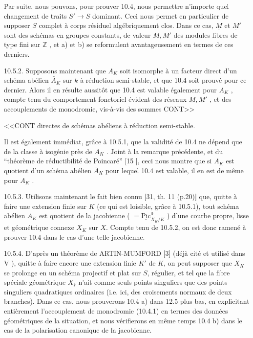 Par suite, nous pouvons, pour prouver 10.4, nous permettre n'importe quel changement de traits $S' \longrightarrow S$ dominant. Ceci nous permet en particulier de supposer $S$ complet à corps résiduel algébriquement clos. Dans ce cas, $\underline{M}$ et $\underline{M}'$ sont des schémas en groupes constants, de valeur $M,M'$ des modules libres de type fini sur $\mathbb{Z}$ , et a) et b) se reformulent avantageusement en termes de ces derniers.

10.5.2. Supposons maintenant que $A_K$ soit isomorphe à un facteur direct d'un schéma abélien $\bar{A}_K$ sur $k$ à réduction semi-stable, et que 10.4 soit prouvé pour ce dernier. Alors il en résulte aussitôt que 10.4 est valable également pour $A_K$ , compte tenu du comportement fonctoriel évident des réseaux $\underline{M},\underline{M}'$ , et des accouplements de monodromie, vis-à-vis des sommes CONT>>



<<CONT directes de schémas abéliens à réduction semi-stable.

Il est également immédiat, grâce à 10.5.1, que la validité de 10.4 ne dépend que de la classe à isogénie près de $A_K$ . Joint à la remarque précédente, et du ``théorème de réductibilité de Poincaré'' [15 \qquad ], ceci nous montre que si $A_K$ est quotient d'un schéma abélien $\bar{A}_K$ pour lequel 10.4 est valable, il en est de même pour $A_K$ .

10.5.3. Utilisons maintenant le fait bien connu [31, th. 11 (p.20)] que, quitte à faire une extension finie sur $K$ (ce qui est loisible, grâce à 10.5.1), tout schéma abélien $A_K$ est quotient de la jacobienne ( $= \underline{\mathrm{Pic}}^{0}_{X_K/K}$ ) d'une courbe propre, lisse et géométrique connexe $X_K$ sur $X$. Compte tenu de 10.5.2, on est donc ramené à prouver 10.4 dans le cas d'une telle jacobienne.

10.5.4. D'après un théorème de ARTIN-MUMFORD [3] (déjà cité et utilisé dans V \qquad ), quitte à faire encore une extension finie $K'$ de $K$, on peut supposer que $X_K$ se prolonge en un schéma projectif et plat sur $S$, régulier, et tel que la fibre spéciale géométrique $X_{\bar{s}}$ n'ait comme seuls points singuliers que des points singuliers quadratiques ordinaires (i.e. ici, des croisements normaux de deux branches). Dans ce cas, nous prouverons 10.4 a) dans 12.5 plus bas, en explicitant entièrement l'accouplement de monodromie (10.4.1) en termes des données géométriques de la situation, et nous vérifierons en même temps 10.4 b) dans le cas de la polarisation canonique de la jacobienne.


